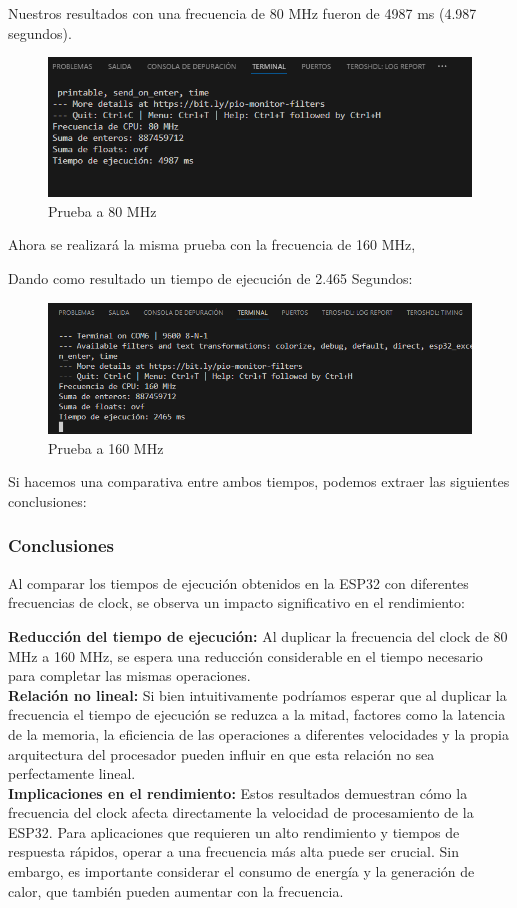 Nuestros resultados con una frecuencia de 80 MHz fueron de 4987 ms (4.987 segundos).

\begin{figure}[H]
    \centering
    \includegraphics[width=0.7\linewidth]{img/ESP32Test80MG.png}
    \caption{Prueba a 80 MHz}
    \label{fig:esp32_80mhz}
\end{figure}

Ahora se realizará la misma prueba con la frecuencia de 160 MHz,

Dando como resultado un tiempo de ejecución de 2.465 Segundos:

\begin{figure}[H]
    \centering
    \includegraphics[width=0.7\linewidth]{img/ESP32Test160Mhz.png}
    \caption{Prueba a 160 MHz}
    \label{fig:esp32_160mhz}
\end{figure}

Si hacemos una comparativa entre ambos tiempos, podemos extraer las siguientes conclusiones:

\subsubsection*{Conclusiones}

Al comparar los tiempos de ejecución obtenidos en la ESP32 con diferentes frecuencias de clock, se observa un impacto significativo en el rendimiento:

\textbf{Reducción del tiempo de ejecución:} Al duplicar la frecuencia del clock de 80 MHz a 160 MHz, se espera una reducción considerable en el tiempo necesario para completar las mismas operaciones. \\
\textbf{Relación no lineal:} Si bien intuitivamente podríamos esperar que al duplicar la frecuencia el tiempo de ejecución se reduzca a la mitad, factores como la latencia de la memoria, la eficiencia de las operaciones a diferentes velocidades y la propia arquitectura del procesador pueden influir en que esta relación no sea perfectamente lineal.\\
\textbf{Implicaciones en el rendimiento:} Estos resultados demuestran cómo la frecuencia del clock afecta directamente la velocidad de procesamiento de la ESP32. Para aplicaciones que requieren un alto rendimiento y tiempos de respuesta rápidos, operar a una frecuencia más alta puede ser crucial. Sin embargo, es importante considerar el consumo de energía y la generación de calor, que también pueden aumentar con la frecuencia.\\

